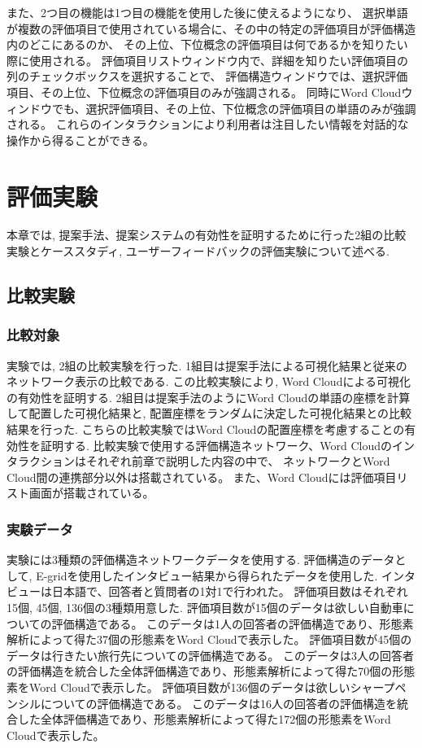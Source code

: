 \documentclass[syuuron]{kuee}
\begin{document}
			また、2つ目の機能は1つ目の機能を使用した後に使えるようになり、
			選択単語が複数の評価項目で使用されている場合に、その中の特定の評価項目が評価構造内のどこにあるのか、
			その上位、下位概念の評価項目は何であるかを知りたい際に使用される。
			評価項目リストウィンドウ内で、詳細を知りたい評価項目の列のチェックボックスを選択することで、
			評価構造ウィンドウでは、選択評価項目、その上位、下位概念の評価項目のみが強調される。
			同時にWord Cloudウィンドウでも、選択評価項目、その上位、下位概念の評価項目の単語のみが強調される。
			これらのインタラクションにより利用者は注目したい情報を対話的な操作から得ることができる。
			

\chapter{評価実験}
	本章では, 提案手法、提案システムの有効性を証明するために行った2組の比較実験とケーススタディ, ユーザーフィードバックの評価実験について述べる. 
	\section{比較実験}
		\subsection{比較対象}
			実験では, 2組の比較実験を行った. 
			1組目は提案手法による可視化結果と従来のネットワーク表示の比較である. 
			この比較実験により, Word Cloudによる可視化の有効性を証明する. 
			2組目は提案手法のようにWord Cloudの単語の座標を計算して配置した可視化結果と, 配置座標をランダムに決定した可視化結果との比較結果を行った. 
			こちらの比較実験ではWord Cloudの配置座標を考慮することの有効性を証明する. 
			比較実験で使用する評価構造ネットワーク、Word Cloudのインタラクションはそれぞれ前章で説明した内容の中で、
			ネットワークとWord Cloud間の連携部分以外は搭載されている。
			また、Word Cloudには評価項目リスト画面が搭載されている。
			
		\subsection{実験データ}
			実験には3種類の評価構造ネットワークデータを使用する. 
			評価構造のデータとして, E-gridを使用したインタビュー結果から得られたデータを使用した.
			インタビューは日本語で、回答者と質問者の1対1で行われた。
			評価項目数はそれぞれ15個, 45個, 136個の3種類用意した. 
			評価項目数が15個のデータは欲しい自動車についての評価構造である。
			このデータは1人の回答者の評価構造であり、形態素解析によって得た37個の形態素をWord Cloudで表示した。
			評価項目数が45個のデータは行きたい旅行先についての評価構造である。
			このデータは3人の回答者の評価構造を統合した全体評価構造であり、形態素解析によって得た70個の形態素をWord Cloudで表示した。
			評価項目数が136個のデータは欲しいシャープペンシルについての評価構造である。
			このデータは16人の回答者の評価構造を統合した全体評価構造であり、形態素解析によって得た172個の形態素をWord Cloudで表示した。
		
\end{document}
